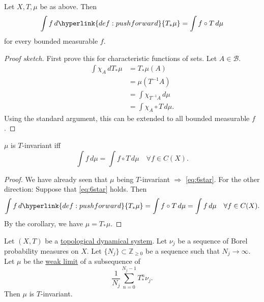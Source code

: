 \documentclass{article}
\begin{document}
\begin{lemma}
  Let $X,T,\mu$ be as above. Then
  \begin{equation*}
    \int f\,d\hyperlink{def:pushforward}{T_*\mu} = \int f \circ T\,d\mu
  \end{equation*}
  for every bounded measurable $f$.
\end{lemma}
\begin{proof}[Proof sketch]
  First prove this for characteristic functions of sets.
  Let $A \in \mathcal{B}$.
  \begin{align*}
    \int \chi_A \,dT_{*}\mu &= T_*\mu(A) \\
                            &= \mu(T^{-1} A) \\
                            &= \int \chi_{T^{-1} A}\,d\mu \\
                            &= \int \chi_A \circ T\,d\mu.
  \end{align*}
  Using the standard argument, this can be extended to all bounded measurable $f$.
\end{proof}
\begin{lemma}
  $\mu$ is $T$-invariant iff
  \begin{equation}
    \int f\,d\mu = \int f \circ T\,d\mu \quad \forall f \in C(X). \tag{$*$}\label{eq:6star}
  \end{equation}
\end{lemma}
\begin{proof}
  We have already seen that $\mu$ being $T$-invariant $\Rightarrow$ \eqref{eq:6star}.
  For the other direction:
  Suppose that \eqref{eq:6star} holds. Then
  \begin{equation*}
    \int f\,d\hyperlink{def:pushforward}{T_* \mu} = \int f \circ T\,d\mu = \int f \, d\mu \quad \forall f \in C(X).
  \end{equation*}
  By the corollary, we have $\mu = T_* \mu$.
\end{proof}
\begin{thm}
  Let $(X,T)$ be a \hyperlink{def:tds}{topological dynamical system}.
  Let $\nu_j$ be a sequence of Borel probability measures on $X$.
  Let $\{N_j\} \subset \mathbb{Z}_{\geq 0}$ be a sequence such that $N_j \to \infty$.
  Let $\mu$ be the \hyperlink{def:weaklimit}{weak limit} of a subsequence of
  \begin{equation*}
    \frac{1}{N_j} \sum_{n=0}^{N_j - 1} T_*^n \nu_j.
  \end{equation*}
  Then $\mu$ is $T$-invariant.
\end{thm}
\end{document}
